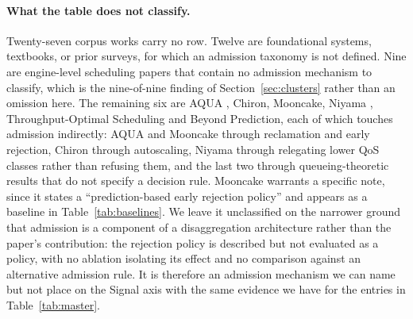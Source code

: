 \paragraph{What the table does not classify.} Twenty-seven corpus works
carry no row. Twelve are foundational systems, textbooks, or prior
surveys, for which an admission taxonomy is not defined. Nine are
engine-level scheduling papers that contain no admission
mechanism to classify, which is the nine-of-nine finding of
Section~\ref{sec:clusters} rather than an omission here. The remaining
six are AQUA \citep{kumar2025aqua}, Chiron, Mooncake, Niyama
\citep{goel2025niyama}, Throughput-Optimal Scheduling and Beyond
Prediction, each of which touches admission indirectly:
AQUA and Mooncake through reclamation and early rejection, Chiron
through autoscaling, Niyama through relegating lower QoS classes rather
than refusing them, and the last two through queueing-theoretic results
that do not specify a decision rule. Mooncake warrants a specific
note, since it states a ``prediction-based early rejection policy'' and
appears as a baseline in Table~\ref{tab:baselines}. We leave it
unclassified on the narrower ground that admission is a component of a
disaggregation architecture rather than the paper's contribution: the
rejection policy is described but not evaluated as a policy, with no
ablation isolating its effect and no comparison against an alternative
admission rule. It is therefore an admission mechanism we can name but
not place on the Signal axis with the same evidence we have for the
entries in Table~\ref{tab:master}.

